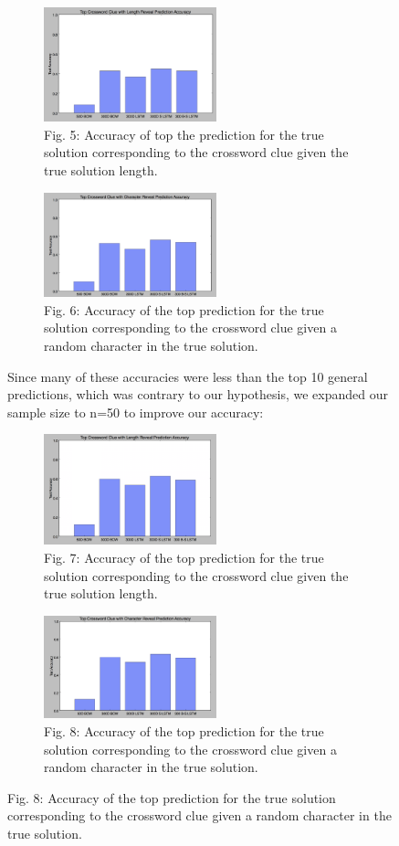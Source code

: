 \documentclass{article} %
\begin{document}
\begin{figure}
\begin{figure}
    \centering
	\includegraphics[width=50mm]{top10len.png}
	\caption{Fig. 5: Accuracy of top the prediction for the true solution corresponding to the crossword clue given the true solution length.}
\end{figure}

\begin{figure}
    \centering
	\includegraphics[width=50mm]{top10char.png}
	\caption{Fig. 6: Accuracy of the top prediction for the true solution corresponding to the crossword clue given a random character in the true solution.}
\end{figure}

Since many of these accuracies were less than the top 10 general predictions, which was contrary to our hypothesis, we expanded our sample size to n=50 to improve our accuracy:

\begin{figure}
    \centering
	\includegraphics[width=50mm]{top50len.png}
	\caption{Fig. 7: Accuracy of the top prediction for the true solution corresponding to the crossword clue given the true solution length.}
\end{figure}

\begin{figure}
    \centering
	\includegraphics[width=50mm]{top50char.png}
	\caption{Fig. 8: Accuracy of the top prediction for the true solution corresponding to the crossword clue given a random character in the true solution.}
\end{figure}



\end{figure}
\end{document}
